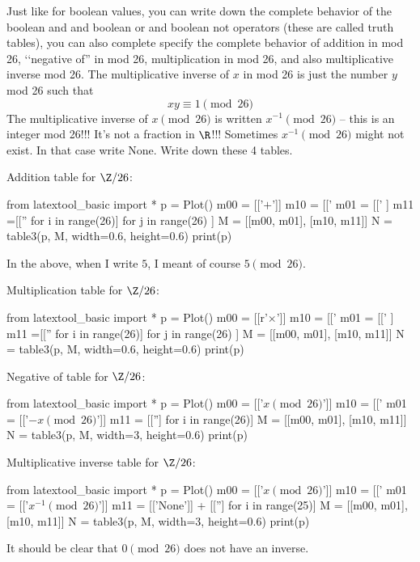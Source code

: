  Just like for boolean values, you can write down the complete
  behavior of the boolean and and boolean or and boolean not operators (these are called truth tables),
  you can also complete specify the complete behavior of
  addition in mod 26, \lq\lq negative of'' in mod 26,
  multiplication in mod 26, and also multiplicative inverse mod 26.
  The multiplicative inverse of $x$ in mod 26 is just the number $y$ mod 26
  such that
  \[
    xy \equiv 1 \pmod{26}
  \]
  The multiplicative inverse of $x \pmod{26}$ is written
  $x^{-1} \pmod{26}$ -- this is an integer mod 26!!! It's not a fraction in $\R$!!!
  Sometimes $x^{-1} \pmod{26}$ might not exist. In that case write None.
  Write down these 4 tables.

Addition table for $\Z/26$:
\begin{python}
from latextool_basic import *
p = Plot()
m00 = [['$+$']]
m10 = [['%
m01 = [['%
      ]
m11 =[['' for i in range(26)] for j in range(26)
     ]
M = [[m00, m01],
[m10, m11]]
N = table3(p, M, width=0.6, height=0.6)
print(p)
\end{python}
In the above, when I write $5$, I meant of course $5 \pmod{26}$.


Multiplication table for $\Z/26$:
\begin{python}
from latextool_basic import *
p = Plot()
m00 = [[r'$\times$']]
m10 = [['%
m01 = [['%
      ]
m11 =[['' for i in range(26)] for j in range(26)
     ]
M = [[m00, m01],
[m10, m11]]
N = table3(p, M, width=0.6, height=0.6)
print(p)
\end{python}


Negative of table for $\Z/26$:
\begin{python}
from latextool_basic import *
p = Plot()
m00 = [['$x \pmod{26}$']]
m10 = [['%
m01 = [['$-x \pmod{26}$']]
m11 = [[''] for i in range(26)]
M = [[m00, m01],
     [m10, m11]]
N = table3(p, M, width=3, height=0.6)
print(p)
\end{python}


Multiplicative inverse table for $\Z/26$:
\begin{python}
from latextool_basic import *
p = Plot()
m00 = [['$x \pmod{26}$']]
m10 = [['%
m01 = [['$x^{-1} \pmod{26}$']]
m11 = [['None']] + [[''] for i in range(25)]
M = [[m00, m01],
     [m10, m11]]
N = table3(p, M, width=3, height=0.6)
print(p)
\end{python}
It should be clear that $0 \pmod{26}$ does not have an inverse.

    
